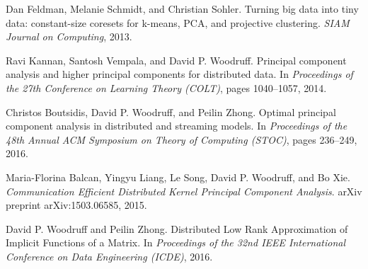 \documentclass{article}
\begin{document}
\begin{thebibliography}{9}

Dan Feldman, Melanie Schmidt, and Christian Sohler.
\newblock Turning big data into tiny data: constant-size coresets for k-means, PCA, and projective clustering.
\newblock \emph{SIAM Journal on Computing}, 2013.

Ravi Kannan, Santosh Vempala, and David P. Woodruff.
\newblock Principal component analysis and higher principal components for distributed data.
\newblock In \emph{Proceedings of the 27th Conference on Learning Theory (COLT)}, pages 1040--1057, 2014.

Christos Boutsidis, David P. Woodruff, and Peilin Zhong.
\newblock Optimal principal component analysis in distributed and streaming models.
\newblock In \emph{Proceedings of the 48th Annual ACM Symposium on Theory of Computing (STOC)}, pages 236--249, 2016.

Maria-Florina Balcan, Yingyu Liang, Le Song, David P. Woodruff, and Bo Xie.
\newblock \emph{Communication Efficient Distributed Kernel Principal Component Analysis}.
\newblock arXiv preprint arXiv:1503.06585, 2015.

David P. Woodruff and Peilin Zhong.
\newblock Distributed Low Rank Approximation of Implicit Functions of a Matrix.
\newblock In \emph{Proceedings of the 32nd IEEE International Conference on Data Engineering (ICDE)}, 2016.

\end{thebibliography}
\end{document}
